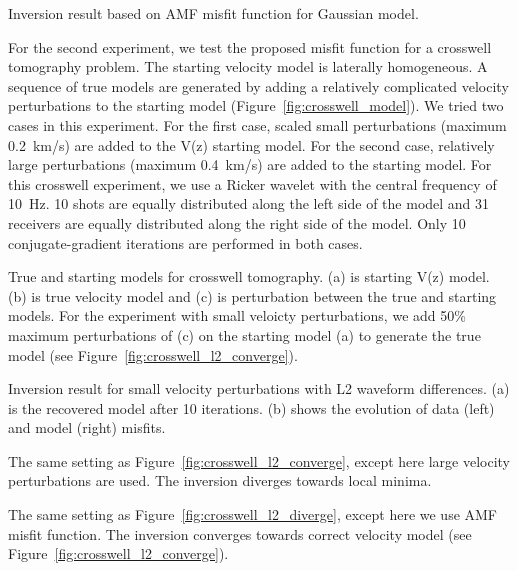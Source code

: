 {\label{fig:gauss_l2_comp1}
Inversion result based on AMF misfit function for Gaussian model.}

For the second experiment, we test the proposed misfit function for a crosswell 
tomography problem. The starting velocity model is laterally homogeneous. A sequence of true 
models are generated by adding a relatively complicated velocity perturbations to the 
starting model (Figure~\ref{fig:crosswell_model}). 
We tried two cases in this experiment. For the first case, scaled small 
perturbations (maximum 0.2~km/s) are added to the V(z) 
starting model. For the second case, relatively large perturbations (maximum 0.4~km/s) 
are added to the starting model. For this crosswell experiment, we use a Ricker wavelet 
with the central frequency of 10~Hz. 10 shots are equally distributed along the left side of 
the model and 31 receivers are equally distributed along the right side of the model. 
Only 10 conjugate-gradient iterations are performed in both cases. 

{\label{fig:crosswell_model}
True and starting models for crosswell tomography. (a) is starting V(z) model. 
(b) is true velocity model and (c) is perturbation between the true and starting models.
For the experiment with small veloicty perturbations, we add 50\% maximum perturbations of (c) on the starting 
model (a) to generate the true model (see Figure~\ref{fig:crosswell_l2_converge}).}

{\label{fig:crosswell_l2_converge}
Inversion result for small velocity perturbations with L2 waveform differences. (a) is 
the recovered model after 10 iterations. (b) shows the evolution of data (left) and model (right) misfits.}

{\label{fig:crosswell_l2_diverge}
The same setting as Figure~\ref{fig:crosswell_l2_converge}, except here large velocity perturbations 
are used. The inversion diverges 
towards local minima.}

{\label{fig:crosswell-lpf-diverge}
The same setting as Figure~\ref{fig:crosswell_l2_diverge}, except here we use 
AMF misfit function. The inversion 
converges towards correct velocity model (see Figure~\ref{fig:crosswell_l2_converge}).}

